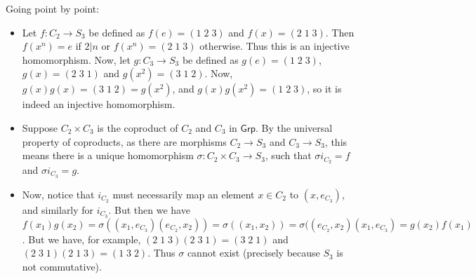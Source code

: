 \begin{solution}
	Going point by point:
	\begin{itemize}
		\item Let $f: C_2 \to S_3$ be defined as $f(e) = (1\;2\;3)$ and $f(x) = (2\;1\;3)$. Then $f(x^n)=e$ if $2 | n$ or $f(x^n)=(2\;1\;3)$ otherwise. Thus this is an injective homomorphism. Now, let $g: C_3 \to S_3$ be defined as $g(e)=(1\;2\;3)$, $g(x)=(2\;3\;1)$ and $g(x^2)=(3\;1\;2)$. Now, $g(x)g(x)=(3\;1\;2)=g(x^2)$, and $g(x)g(x^2)=(1\;2\;3)$, so it is indeed an injective homomorphism.
		\item Suppose $C_2 \times C_3$ is the coproduct of $C_2$ and $C_3$ in $\mathsf{Grp}$. By the universal property of coproducts,  as there are morphisms $C_2 \to S_3$ and $C_3 \to S_3$, this means there is a unique homomorphism $\sigma: C_2 \times C_3 \to S_3$, such that $\sigma i_{C_2} = f$ and $\sigma i_{C_3} = g$.
		\item Now, notice that $i_{C_2}$ must necessarily map an element $x \in C_2$ to $(x, e_{C_3})$, and similarly for $i_{C_3}$. But then we have $f(x_1)g(x_2)=\sigma((x_1, e_{C_3})(e_{C_2}, x_2))=\sigma((x_1, x_2))=\sigma((e_{C_2}, x_2)(x_1, e_{C_3})=g(x_2)f(x_1)$. But we have, for example, $(2\;1\;3)(2\;3\;1)=(3\;2\;1)$ and $(2\;3\;1)(2\;1\;3)=(1\;3\;2)$. Thus $\sigma$ cannot exist (precisely because $S_3$ is not commutative). \qedhere
	\end{itemize}
\end{solution}

\begin{problem}
\end{problem}

